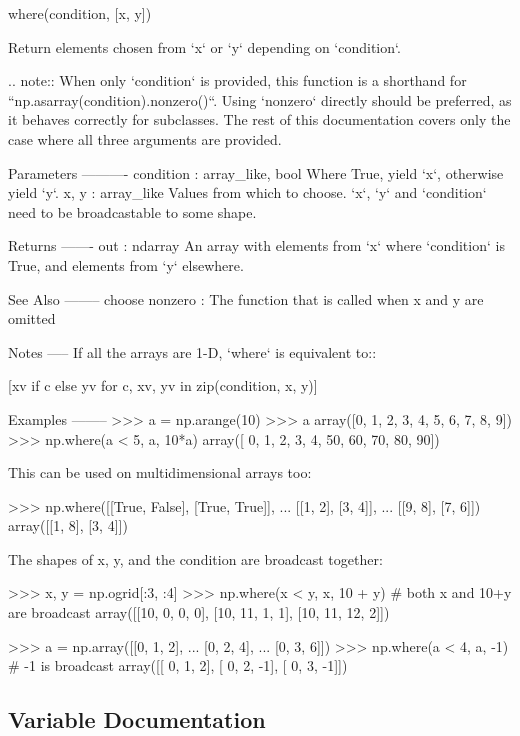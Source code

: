 \begin{DoxyVerb}where(condition, [x, y])

Return elements chosen from `x` or `y` depending on `condition`.

.. note::
    When only `condition` is provided, this function is a shorthand for
    ``np.asarray(condition).nonzero()``. Using `nonzero` directly should be
    preferred, as it behaves correctly for subclasses. The rest of this
    documentation covers only the case where all three arguments are
    provided.

Parameters
----------
condition : array_like, bool
    Where True, yield `x`, otherwise yield `y`.
x, y : array_like
    Values from which to choose. `x`, `y` and `condition` need to be
    broadcastable to some shape.

Returns
-------
out : ndarray
    An array with elements from `x` where `condition` is True, and elements
    from `y` elsewhere.

See Also
--------
choose
nonzero : The function that is called when x and y are omitted

Notes
-----
If all the arrays are 1-D, `where` is equivalent to::

    [xv if c else yv
     for c, xv, yv in zip(condition, x, y)]

Examples
--------
>>> a = np.arange(10)
>>> a
array([0, 1, 2, 3, 4, 5, 6, 7, 8, 9])
>>> np.where(a < 5, a, 10*a)
array([ 0,  1,  2,  3,  4, 50, 60, 70, 80, 90])

This can be used on multidimensional arrays too:

>>> np.where([[True, False], [True, True]],
...          [[1, 2], [3, 4]],
...          [[9, 8], [7, 6]])
array([[1, 8],
       [3, 4]])

The shapes of x, y, and the condition are broadcast together:

>>> x, y = np.ogrid[:3, :4]
>>> np.where(x < y, x, 10 + y)  # both x and 10+y are broadcast
array([[10,  0,  0,  0],
       [10, 11,  1,  1],
       [10, 11, 12,  2]])

>>> a = np.array([[0, 1, 2],
...               [0, 2, 4],
...               [0, 3, 6]])
>>> np.where(a < 4, a, -1)  # -1 is broadcast
array([[ 0,  1,  2],
       [ 0,  2, -1],
       [ 0,  3, -1]])
\end{DoxyVerb}
 

\subsection{Variable Documentation}
\mbox{\label{namespacenumpy_1_1core_1_1multiarray_a8f0985446cd1812ab7345b24aaf37a2b}} 
